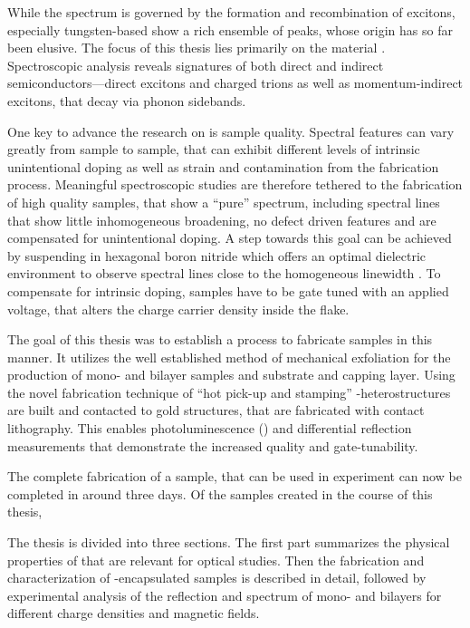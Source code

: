 While the spectrum is governed by the formation and recombination of excitons, especially tungsten-based \tmds show a rich ensemble of peaks, whose origin has so far been elusive. The focus of this thesis lies primarily on the material \wse\!. Spectroscopic analysis reveals signatures of both direct and indirect semiconductors---direct excitons and charged trions as well as momentum-indirect excitons, that decay via phonon sidebands.

One key to advance the research on \tmds is sample quality. Spectral features can vary greatly from sample to sample, that can exhibit different levels of intrinsic unintentional doping as well as strain and contamination from the fabrication process. Meaningful spectroscopic studies are therefore tethered to the fabrication of high quality samples, that show a ``pure'' spectrum, including spectral lines that show little inhomogeneous broadening, no defect driven features and are compensated for unintentional doping. A step towards this goal can be achieved by suspending \tmds in hexagonal boron nitride which offers an optimal dielectric environment to observe spectral lines close to the homogeneous linewidth \cite{dean_boron_2010,cadiz_excitonic_2017}. To compensate for intrinsic doping, samples have to be gate tuned with an applied voltage, that alters the charge carrier density inside the flake.

The goal of this thesis was to establish a process to fabricate samples in this manner. It utilizes the well established method of mechanical exfoliation for the production of \tmdg mono- and bilayer samples and \hbng substrate and capping layer. Using the novel fabrication technique of ``hot pick-up and stamping'' \hbn-\tmdg heterostructures are built and contacted to gold structures, that are fabricated with contact lithography. This enables photoluminescence (\pl) and differential reflection measurements that demonstrate the increased quality and gate-tunability.

The complete fabrication of a sample, that can be used in experiment can now be completed in around three days. Of the samples created in the course of this thesis, 

The thesis is divided into three sections. The first part summarizes the physical properties of \tmds that are relevant for optical studies. Then the fabrication and characterization of \hbn-encapsulated samples is described in detail, followed by experimental analysis of the reflection and \pl spectrum of \wse mono- and bilayers for different charge densities and magnetic fields.




